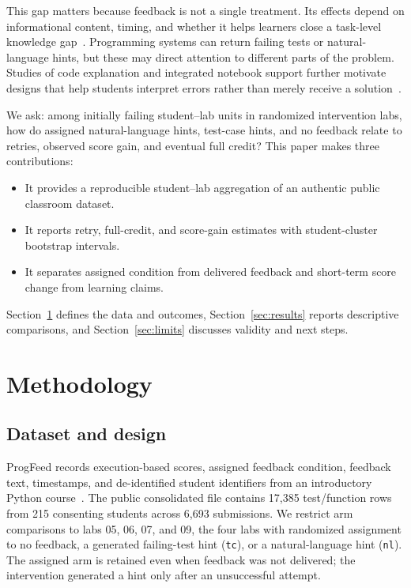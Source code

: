 \documentclass[conference]{IEEEtran}
\begin{document}
This gap matters because feedback is not a single treatment. Its effects depend on informational content, timing, and whether it helps learners close a task-level knowledge gap~\cite{hattie2007,shute2008,wisniewski2020}. Programming systems can return failing tests or natural-language hints, but these may direct attention to different parts of the problem. Studies of code explanation and integrated notebook support further motivate designs that help students interpret errors rather than merely receive a solution~\cite{denny2024,kuramitsu2023}.

We ask: among initially failing student--lab units in randomized intervention labs, how do assigned natural-language hints, test-case hints, and no feedback relate to retries, observed score gain, and eventual full credit? This paper makes three contributions:\begin{itemize}
\item It provides a reproducible student--lab aggregation of an authentic public classroom dataset.
\item It reports retry, full-credit, and score-gain estimates with student-cluster bootstrap intervals.
\item It separates assigned condition from delivered feedback and short-term score change from learning claims.
\end{itemize} Section~\ref{sec:method} defines the data and outcomes, Section~\ref{sec:results} reports descriptive comparisons, and Section~\ref{sec:limits} discusses validity and next steps.

\section{Methodology}\label{sec:method}
\subsection{Dataset and design}
ProgFeed records execution-based scores, assigned feedback condition, feedback text, timestamps, and de-identified student identifiers from an introductory Python course~\cite{heickal2026}. The public consolidated file contains 17,385 test/function rows from 215 consenting students across 6,693 submissions. We restrict arm comparisons to labs 05, 06, 07, and 09, the four labs with randomized assignment to no feedback, a generated failing-test hint (\texttt{tc}), or a natural-language hint (\texttt{nl}). The assigned arm is retained even when feedback was not delivered; the intervention generated a hint only after an unsuccessful attempt.
\end{document}
